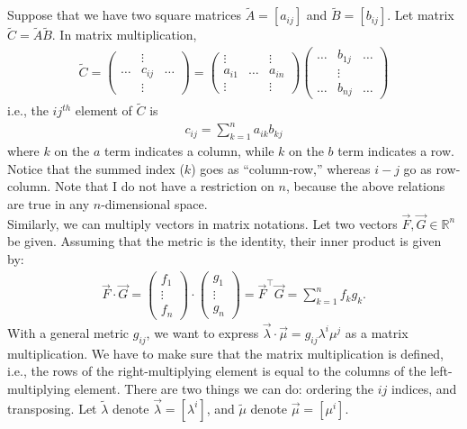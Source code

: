 \documentclass{book}
\theoremstyle{definition}
\begin{document}
Suppose that we have two square matrices $\tilde{A} = [a_{ij}]$ and $\tilde{B} = [b_{ij}]$. Let matrix $\tilde{C} = \tilde{A}\tilde{B}$. In matrix multiplication,
\begin{align*}
\boxed{
\tilde{C} = 
\begin{pmatrix}
&\vdots&\\
\dots&c_{ij}&\dots\\
&\vdots&
\end{pmatrix}
=
\begin{pmatrix}
\vdots&&\vdots\\
a_{i1} & \dots & a_{in}\\
\vdots&&\vdots
\end{pmatrix}
\begin{pmatrix}
\dots&b_{1j}&\dots\\
&\vdots&\\
\dots&b_{nj}&\dots
\end{pmatrix}
}
\end{align*} 
i.e., the $ij^{th}$ element of $\tilde{C}$ is 
\begin{align*}
\boxed{c_{ij} = \sum_{k=1}^na_{ik}b_{kj}}
\end{align*}
where $k$ on the $a$ term indicates a column, while $k$ on the $b$ term indicates a row. Notice that the summed index ($k$) goes as ``column-row,'' whereas $i-j$ go as row-column. Note that I do not have a restriction on $n$, because the above relations are true in any $n$-dimensional space. \\

Similarly, we can multiply vectors in matrix notations. Let two vectors $\vec{F}, \vec{G} \in \mathbb{R}^n$ be given. Assuming that the metric is the identity, their inner product is given by:
\begin{align*}
\boxed{
\vec{F}\cdot\vec{G} = 
\begin{pmatrix}
f_1\\
\vdots\\
f_n
\end{pmatrix}\cdot
\begin{pmatrix}
g_1\\
\vdots\\
g_n
\end{pmatrix}
=
\vec{F}^\top\vec{G} 
=
\sum_{k=1}^{n}f_kg_k.
}
\end{align*}
With a general metric $g_{ij}$, we want to express $\vec{\lambda}\cdot\vec{\mu} = g_{ij}\lambda^i\mu^j$ as a matrix multiplication. We have to make sure that the matrix multiplication is defined, i.e., the rows of the right-multiplying element is equal to the columns of the left-multiplying element. There are two things we can do: ordering the $ij$ indices, and transposing. Let $\tilde{\lambda}$ denote $\vec{\lambda} = [\lambda^i]$, and $\tilde{\mu}$ denote $\vec{\mu} = [\mu^i]$.
\end{document}
